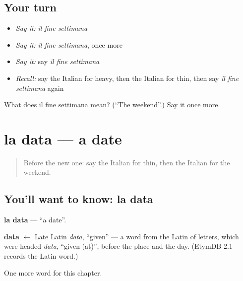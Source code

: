 \subsection*{Your turn}
\begin{itemize}
\raggedright
  \item \emph{Say it:} \emph{il fine settimana}
  \item \emph{Say it:} \emph{il fine settimana}, once more
  \item \emph{Say it:} say \emph{il fine settimana}
  \item \emph{Recall:} say the Italian for heavy, then the Italian for thin, then say \emph{il fine settimana} again
\end{itemize}

\begin{tcolorbox}[breakable,colback=teal!4,colframe=teal!35!black,title={Before you move on}]
What does il fine settimana mean? (\textquotedblleft{}The weekend\textquotedblright{}.) Say it once more.
\end{tcolorbox}
\section[la data]{la data — a date}

\label{lesson:IT-C131-data}



\begin{quote}
Before the new one: say the Italian for thin, then the Italian for the weekend.
\end{quote}

\subsection*{You'll want to know: la data}
\textbf{la data} — \textquotedblleft{}a date\textquotedblright{}.

\begin{cousinweb}
\textbf{data} $\leftarrow$ Late Latin \emph{data}, \textquotedblleft{}given\textquotedblright{} — a word from the Latin of letters, which were headed \emph{data}, \textquotedblleft{}given (at)\textquotedblright{}, before the place and the day. (EtymDB 2.1 records the Latin word.)
\end{cousinweb}

\begin{grammarlens}[title={What you've built}]
One more word for this chapter.
\end{grammarlens}

